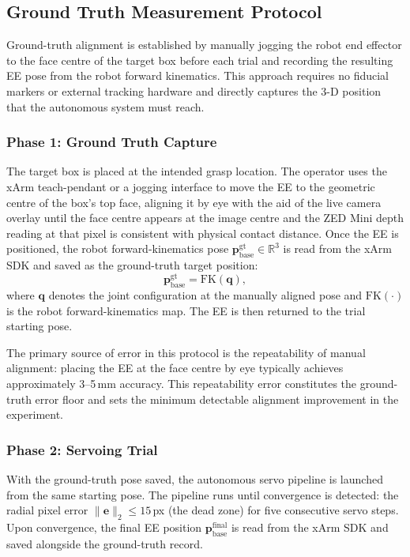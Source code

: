 \documentclass[lettersize,journal]{IEEEtran}
\begin{document}
\subsection{Ground Truth Measurement Protocol}
\label{sec:gt}

Ground-truth alignment is established by manually jogging the robot end
effector to the face centre of the target box before each trial and
recording the resulting EE pose from the robot forward kinematics.  This
approach requires no fiducial markers or external tracking hardware and
directly captures the 3-D position that the autonomous system must reach.

\subsubsection{Phase 1: Ground Truth Capture}

The target box is placed at the intended grasp location.  The operator
uses the xArm teach-pendant or a jogging interface to move the EE to the
geometric centre of the box's top face, aligning it by eye with the aid
of the live camera overlay until the face centre appears at the image
centre and the ZED Mini depth reading at that pixel is consistent with
physical contact distance.  Once the EE is positioned, the robot
forward-kinematics pose $\mathbf{p}^{\text{gt}}_{\text{base}} \in
\mathbb{R}^3$ is read from the xArm SDK and saved as the ground-truth
target position:
\begin{equation}
  \mathbf{p}^{\text{gt}}_{\text{base}} = \text{FK}(\mathbf{q}),
  \label{eq:gt_fk}
\end{equation}
where $\mathbf{q}$ denotes the joint configuration at the manually
aligned pose and $\text{FK}(\cdot)$ is the robot forward-kinematics map.
The EE is then returned to the trial starting pose.

The primary source of error in this protocol is the repeatability of
manual alignment: placing the EE at the face centre by eye typically
achieves approximately 3--5\,mm accuracy.  This repeatability error
constitutes the ground-truth error floor and sets the minimum detectable
alignment improvement in the experiment.

\subsubsection{Phase 2: Servoing Trial}

With the ground-truth pose saved, the autonomous servo pipeline is
launched from the same starting pose.  The pipeline runs until convergence
is detected: the radial pixel error $\lVert\mathbf{e}\rVert_2 \leq 15$\,px
(the dead zone) for five consecutive servo steps.  Upon convergence, the
final EE position $\mathbf{p}^{\text{final}}_{\text{base}}$ is read from
the xArm SDK and saved alongside the ground-truth record.
\end{document}
